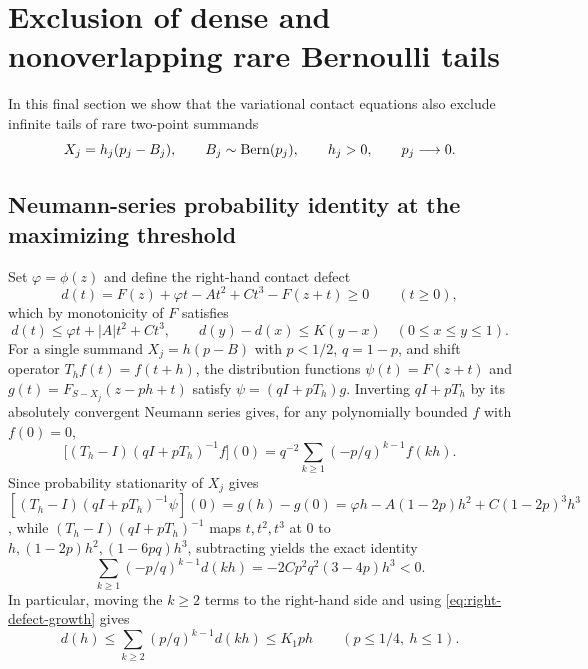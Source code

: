 \section{Exclusion of dense and nonoverlapping rare Bernoulli tails}\label{sec:rare-tails}

In this final section we show that the variational contact equations also
exclude infinite tails of rare two-point summands
\[
 X_j=h_j(p_j-B_j),\qquad B_j\sim\operatorname{Bern}(p_j),\qquad h_j>0,\qquad p_j\longrightarrow0.
\]

\subsection{Neumann-series probability identity at the maximizing threshold}

Set $\varphi=\phi(z)$ and define the right-hand contact defect
\begin{equation}\label{eq:right-defect}
 d(t)=F(z)+\varphi t-At^2+Ct^3-F(z+t)\ge0\qquad(t\ge0),
\end{equation}
which by monotonicity of $F$ satisfies
\begin{equation}\label{eq:right-defect-growth}
 d(t)\le\varphi t+|A|t^2+Ct^3,\qquad
 d(y)-d(x)\le K(y-x)\quad(0\le x\le y\le1).
\end{equation}
For a single summand $X_j=h(p-B)$ with $p<1/2$, $q=1-p$, and shift operator
$T_hf(t)=f(t+h)$, the distribution functions $\psi(t)=F(z+t)$ and
$g(t)=F_{S-X_j}(z-ph+t)$ satisfy $\psi=(qI+pT_h)g$. Inverting $qI+pT_h$ by
its absolutely convergent Neumann series gives, for any polynomially bounded
$f$ with $f(0)=0$,
\begin{equation}\label{eq:resolvent}
 \bigl[(T_h-I)(qI+pT_h)^{-1}f\bigr](0)
       =q^{-2}\sum_{k\ge1}(-p/q)^{k-1}f(kh).
\end{equation}
Since probability stationarity of $X_j$ gives
$[(T_h-I)(qI+pT_h)^{-1}\psi](0)=g(h)-g(0)=\varphi h-A(1-2p)h^2+C(1-2p)^3h^3$,
while $(T_h-I)(qI+pT_h)^{-1}$ maps $t,t^2,t^3$ at $0$ to
$h,(1-2p)h^2,(1-6pq)h^3$, subtracting yields the exact identity
\begin{equation}\label{eq:rare-score}
 \sum_{k\ge1}(-p/q)^{k-1}d(kh)
                   =-2Cp^2q^2(3-4p)h^3<0.
\end{equation}
In particular, moving the $k\ge2$ terms to the right-hand side and using
\eqref{eq:right-defect-growth} gives
\begin{equation}\label{eq:rare-defect-bound}
 d(h)\le\sum_{k\ge2}(p/q)^{k-1}d(kh)\le K_1ph
                      \qquad(p\le1/4,\ h\le1).
\end{equation}

